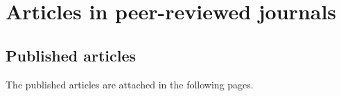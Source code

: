 \chapter{Articles in peer-reviewed journals}\label{chapter:papers}
            
\section*{Published articles}


The published articles are attached in the following pages.

\begin{refsection}%
\nocite{*}
\printbibliography[keyword=publicado,heading=none] %
\end{refsection}%







